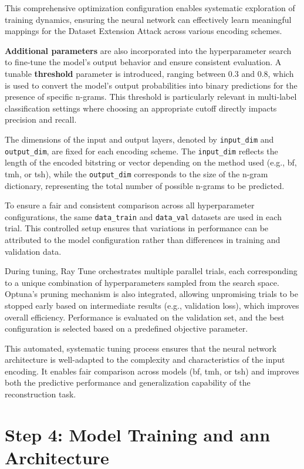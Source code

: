 This comprehensive optimization configuration enables systematic exploration of training dynamics, ensuring the neural network can effectively learn meaningful mappings for the Dataset Extension Attack across various encoding schemes.

\textbf{Additional parameters} are also incorporated into the hyperparameter search to fine-tune the model's output behavior and ensure consistent evaluation.
A tunable \textbf{threshold} parameter is introduced, ranging between 0.3 and 0.8, which is used to convert the model's output probabilities into binary predictions for the presence of specific n-grams.
This threshold is particularly relevant in multi-label classification settings where choosing an appropriate cutoff directly impacts precision and recall.

The dimensions of the input and output layers, denoted by \texttt{input\_dim} and \texttt{output\_dim}, are fixed for each encoding scheme.
The \texttt{input\_dim} reflects the length of the encoded bitstring or vector depending on the method used (e.g., \ac{bf}, \ac{tmh}, or \ac{tsh}), while the \texttt{output\_dim} corresponds to the size of the n-gram dictionary, representing the total number of possible n-grams to be predicted.

To ensure a fair and consistent comparison across all hyperparameter configurations, the same \texttt{data\_train} and \texttt{data\_val} datasets are used in each trial.
This controlled setup ensures that variations in performance can be attributed to the model configuration rather than differences in training and validation data.

During tuning, Ray Tune orchestrates multiple parallel trials, each corresponding to a unique combination of hyperparameters sampled from the search space.
Optuna's pruning mechanism is also integrated, allowing unpromising trials to be stopped early based on intermediate results (e.g., validation loss), which improves overall efficiency.
Performance is evaluated on the validation set, and the best configuration is selected based on a predefined objective parameter.

This automated, systematic tuning process ensures that the neural network architecture is well-adapted to the complexity and characteristics of the input encoding.
It enables fair comparison across models (\ac{bf}, \ac{tmh}, or \ac{tsh}) and improves both the predictive performance and generalization capability of the reconstruction task.

\section{Step 4: Model Training and \ac{ann} Architecture}

